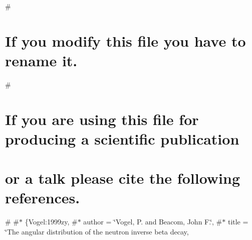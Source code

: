 \# \section*{If you modify this file you have to rename it.}

\# \section*{If you are using this file for producing a scientific publication}

\section*{or a talk please cite the following references.}

\# \#$\ast$ \{Vogel\+:1999zy, \#$\ast$ author = \char`\"{}\+Vogel, P. and Beacom, John F.\char`\"{}, \#$\ast$ title = \char`\"{}\+The angular distribution of the neutron inverse beta decay,
